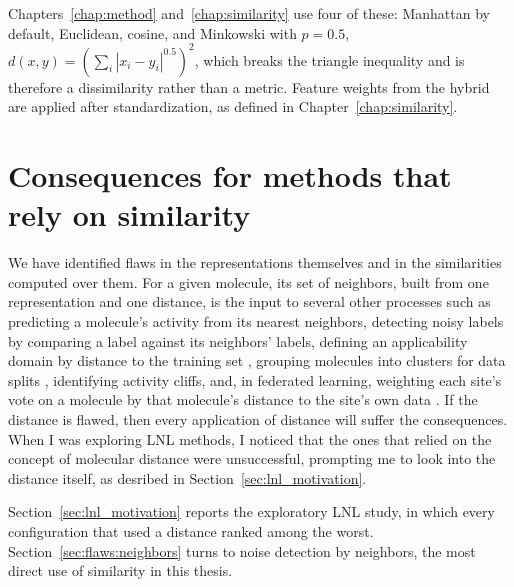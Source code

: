 Chapters~\ref{chap:method} and~\ref{chap:similarity} use four of these: Manhattan by default, Euclidean, cosine, and Minkowski with $p=0.5$, $d(x,y)=\left(\sum_i |x_i-y_i|^{0.5}\right)^{2}$, which breaks the triangle inequality and is therefore a dissimilarity rather than a metric. Feature weights from the hybrid are applied after standardization, as defined in Chapter~\ref{chap:similarity}.


\section{Consequences for methods that rely on similarity}\label{sec:flaws:consequences}


We have identified flaws in the representations themselves and in the similarities computed over them. For a given molecule, its set of neighbors, built from one representation and one distance, is the input to several other processes such as predicting a molecule's activity from its nearest neighbors, detecting noisy labels by comparing a label against its neighbors' labels, defining an applicability domain by distance to the training set \citep{Tropsha2010}, grouping molecules into clusters for data splits \citep{Butina1999}, identifying activity cliffs, and, in federated learning, weighting each site's vote on a molecule by that molecule's distance to the site's own data \citep{Hanser2025}. If the distance is flawed, then every application of distance will suffer the consequences. When I was exploring LNL methods, I noticed that the ones that relied on the concept of molecular distance were unsuccessful, prompting me to look into the distance itself, as desribed in  Section~\ref{sec:lnl_motivation}.

Section~\ref{sec:lnl_motivation} reports the exploratory LNL study, in which every configuration that used a distance ranked among the worst. Section~\ref{sec:flaws:neighbors} turns to noise detection by neighbors, the most direct use of similarity in this thesis. 

